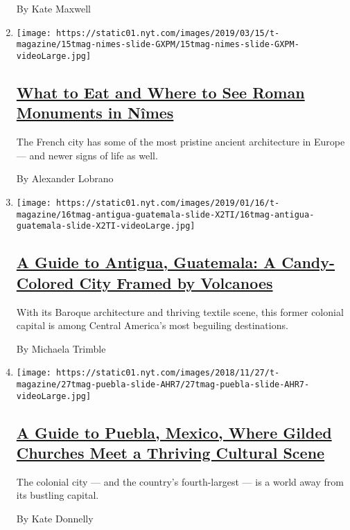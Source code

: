 \begin{enumerate}
  By Kate Maxwell
\item
  \texttt{[image: https://static01.nyt.com/images/2019/03/15/t-magazine/15tmag-nimes-slide-GXPM/15tmag-nimes-slide-GXPM-videoLarge.jpg]}

  \hypertarget{what-to-eat-and-where-to-see-roman-monuments-in-nuxeemes}{%
  \subsection{\texorpdfstring{\href{/2019/03/15/t-magazine/nimes-france-travel-guide.html}{What
  to Eat and Where to See Roman Monuments in
  Nîmes}}{What to Eat and Where to See Roman Monuments in Nîmes}}\label{what-to-eat-and-where-to-see-roman-monuments-in-nuxeemes}}

  The French city has some of the most pristine ancient architecture in
  Europe --- and newer signs of life as well.

  By Alexander Lobrano
\item
  \texttt{[image: https://static01.nyt.com/images/2019/01/16/t-magazine/16tmag-antigua-guatemala-slide-X2TI/16tmag-antigua-guatemala-slide-X2TI-videoLarge.jpg]}

  \hypertarget{a-guide-to-antigua-guatemala-a-candy-colored-city-framed-by-volcanoes}{%
  \subsection{\texorpdfstring{\href{/2019/01/21/t-magazine/antigua-guatemala-travel-guide.html}{A
  Guide to Antigua, Guatemala: A Candy-Colored City Framed by
  Volcanoes}}{A Guide to Antigua, Guatemala: A Candy-Colored City Framed by Volcanoes}}\label{a-guide-to-antigua-guatemala-a-candy-colored-city-framed-by-volcanoes}}

  With its Baroque architecture and thriving textile scene, this former
  colonial capital is among Central America's most beguiling
  destinations.

  By Michaela Trimble
\item
  \texttt{[image: https://static01.nyt.com/images/2018/11/27/t-magazine/27tmag-puebla-slide-AHR7/27tmag-puebla-slide-AHR7-videoLarge.jpg]}

  \hypertarget{a-guide-to-puebla-mexico-where-gilded-churches-meet-a-thriving-cultural-scene}{%
  \subsection{\texorpdfstring{\href{/2018/11/27/t-magazine/puebla-mexico-travel-guide.html}{A
  Guide to Puebla, Mexico, Where Gilded Churches Meet a Thriving
  Cultural
  Scene}}{A Guide to Puebla, Mexico, Where Gilded Churches Meet a Thriving Cultural Scene}}\label{a-guide-to-puebla-mexico-where-gilded-churches-meet-a-thriving-cultural-scene}}

  The colonial city --- and the country's fourth-largest --- is a world
  away from its bustling capital.

  By Kate Donnelly
\end{enumerate}

